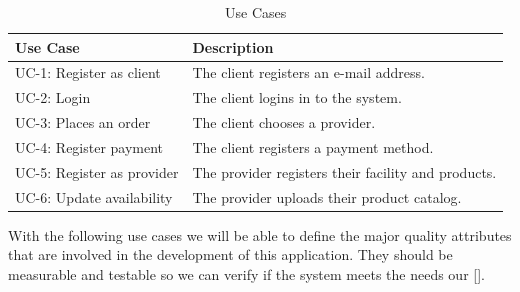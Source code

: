\begin{table}[H]    

    \begin{tabularx}{\textwidth}{lX}
    \toprule
    Use Case & Description  \\
    \midrule
    UC-1: Register as \gls{client} & The \gls{client} registers an e-mail address.\\
    UC-2: Login & The \gls{client} logins in to the system. \\
    UC-3: Places an order & The \gls{client} chooses a \gls{provider}. \\
    UC-4: Register payment & The \gls{client} registers a payment method. \\
    UC-5: Register as \gls{provider} & The \gls{provider} registers their facility and products. \\
    UC-6: Update availability & The \gls{provider} uploads their product catalog. \\
    \bottomrule
    \end{tabularx}
    \caption{Use Cases}
\end{table}

With the following use cases we will  be able to define the major quality attributes that are involved in the 
development of this application. They should be measurable and testable so we can verify if the system meets 
the needs our  [\cite{refbook:DSHC}].

